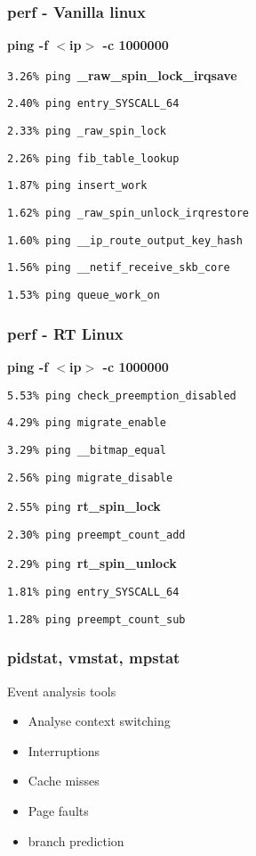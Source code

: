 \begin{frame}
	\frametitle{perf - Vanilla linux}
	\textbf{ping -f $<$ip$>$ -c 1000000}

	\texttt{3.26\%  ping }\textbf{\_raw\_spin\_lock\_irqsave}

\texttt{2.40\%  ping  entry\_SYSCALL\_64}

\texttt{2.33\%  ping  \_raw\_spin\_lock}

\texttt{2.26\%  ping  fib\_table\_lookup}

\texttt{1.87\%  ping  insert\_work}

\texttt{1.62\%  ping  \_raw\_spin\_unlock\_irqrestore}

\texttt{1.60\%  ping  \_\_ip\_route\_output\_key\_hash}

\texttt{1.56\%  ping  \_\_netif\_receive\_skb\_core}

\texttt{1.53\%  ping  queue\_work\_on}
\end{frame}


\begin{frame}
	\frametitle{perf - RT Linux}
	\textbf{ping -f $<$ip$>$ -c 1000000}

\texttt{5.53\%  ping check\_preemption\_disabled}

\texttt{4.29\%  ping migrate\_enable}

\texttt{3.29\%  ping \_\_bitmap\_equal}

\texttt{2.56\%  ping migrate\_disable}

\texttt{2.55\%  ping }\textbf{rt\_spin\_lock}

\texttt{2.30\%  ping preempt\_count\_add}

\texttt{2.29\%  ping }\textbf{rt\_spin\_unlock}

\texttt{1.81\%  ping entry\_SYSCALL\_64}

\texttt{1.28\%  ping preempt\_count\_sub}
\end{frame}


\begin{frame}
	\frametitle{pidstat, vmstat, mpstat}
Event analysis tools
	\begin{itemize}
		\item Analyse context switching
		\item Interruptions
		\item Cache misses
		\item Page faults
		\item branch prediction
	\end{itemize}
\end{frame}


